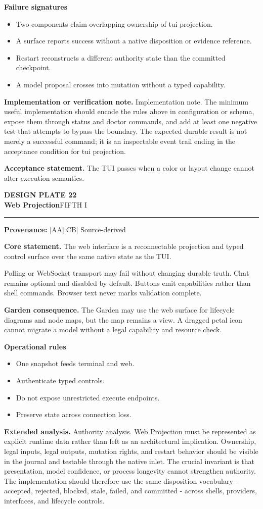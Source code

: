 \documentclass[10pt,letterpaper,oneside]{article}
\newcommand{\prov}[1]{\textcolor{gardenBlue}{\sffamily\footnotesize\textbf{Provenance:} #1}}
\newcommand{\platetitle}[3]{%
  \begin{minipage}[t][0.54in][t]{\textwidth}
  {\sffamily\bfseries\color{gardenDeep}\fontsize{9}{10}\selectfont DESIGN PLATE #1}\\[-1pt]
  {\sffamily\bfseries\color{gardenInk}\fontsize{16.5}{18}\selectfont #2}\hfill{\sffamily\color{gardenGreen}\large #3}
  \end{minipage}\vspace{-2pt}\hrule\vspace{5pt}}
\begin{document}
\textbf{Failure signatures}
\begin{itemize}
\item Two components claim overlapping ownership of tui projection.
\item A surface reports success without a native disposition or evidence reference.
\item Restart reconstructs a different authority state than the committed checkpoint.
\item A model proposal crosses into mutation without a typed capability.
\end{itemize}
\textbf{Implementation or verification note.} Implementation note. The minimum useful implementation should encode the rules above in configuration or schema, expose them through status and doctor commands, and add at least one negative test that attempts to bypass the boundary. The expected durable result is not merely a successful command; it is an inspectable event trail ending in the acceptance condition for tui projection.

\begin{acceptbox}
\textbf{Acceptance statement.} The TUI passes when a color or layout change cannot alter execution semantics.
\end{acceptbox}
\newpage
\platetitle{22}{Web Projection}{FIFTH I}
\prov{[AA][CB] Source-derived}
\fontsize{8.85}{10.45}\selectfont
\begin{corebox}
\textbf{Core statement.} The web interface is a reconnectable projection and typed control surface over the same native state as the TUI.
\end{corebox}
Polling or WebSocket transport may fail without changing durable truth. Chat remains optional and disabled by default. Buttons emit capabilities rather than shell commands. Browser text never marks validation complete.

\textbf{Garden consequence.} The Garden may use the web surface for lifecycle diagrams and node maps, but the map remains a view. A dragged petal icon cannot migrate a model without a legal capability and resource check.

\textbf{Operational rules}
\begin{itemize}
\item One snapshot feeds terminal and web.
\item Authenticate typed controls.
\item Do not expose unrestricted execute endpoints.
\item Preserve state across connection loss.
\end{itemize}
\textbf{Extended analysis.} Authority analysis. Web Projection must be represented as explicit runtime data rather than left as an architectural implication. Ownership, legal inputs, legal outputs, mutation rights, and restart behavior should be visible in the journal and testable through the native inlet. The crucial invariant is that presentation, model confidence, or process longevity cannot strengthen authority. The implementation should therefore use the same disposition vocabulary - accepted, rejected, blocked, stale, failed, and committed - across shells, providers, interfaces, and lifecycle controls.
\end{document}
